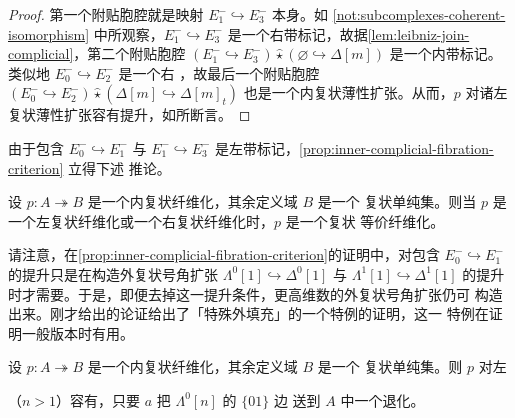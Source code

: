 \begin{proof}
第一个附贴胞腔就是映射 $E_{1}^{-}\hookrightarrow E_{3}^{-}$ 本身。如
\cref{not:subcomplexes-coherent-isomorphism} 中所观察，$E_{1}^{-}\hookrightarrow E_{3}^{-}$
是一个右带标记\trAnodyneExtension，故据\cref{lem:leibniz-join-complicial}，第二个附贴胞腔
$(E_{1}^{-}\hookrightarrow E_{3}^{-})\mathbin{\hat{\star}}(\varnothing\hookrightarrow\Delta[m])$
是一个内带标记\trAnodyneExtension。类似地 $E_{0}^{-}\hookrightarrow E_{2}^{-}$ 是一个右%
\trAnodyneExtension，故最后一个附贴胞腔
$(E_{0}^{-}\hookrightarrow E_{2}^{-})\mathbin{\hat{\star}}(\Delta[m]\hookrightarrow\Delta[m]_{t})$
也是一个内复状薄性扩张。从而，$p$ 对诸左复状薄性扩张容有提升，如所断言。
\end{proof}

由于包含 $E_{0}^{-}\hookrightarrow E_{1}^{-}$ 与 $E_{1}^{-}\hookrightarrow E_{3}^{-}$
是左带标记\trAnodyneExtension，\cref{prop:inner-complicial-fibration-criterion} 立得下述
推论。

\begin{corollary}\label{cor:left-right-complicial-fibration}
设 $p\colon A\twoheadrightarrow B$ 是一个内复状纤维化，其余定义域 $B$ 是一个
复状单纯集。则当 $p$ 是一个左复状纤维化或一个右复状纤维化时，$p$ 是一个复状
等价纤维化。
\end{corollary}

请注意，在\cref{prop:inner-complicial-fibration-criterion}的证明中，对包含
$E_{0}^{-}\hookrightarrow E_{1}^{-}$ 的提升只是在构造外复状号角扩张
$\Lambda^{0}[1]\hookrightarrow\Delta^{0}[1]$ 与 $\Lambda^{1}[1]\hookrightarrow\Delta^{1}[1]$
的提升时才需要。于是，即便去掉这一提升条件，更高维数的外复状号角扩张仍可
构造出来。刚才给出的论证给出了「特殊外\trHorn{}填充」的一个特例的证明，这一
特例在证明一般版本时有用。

\begin{lemma}\label{lem:left-horn-filling-degenerate-edge}
设 $p\colon A\twoheadrightarrow B$ 是一个内复状纤维化，其余定义域 $B$ 是一个
复状单纯集。则 $p$ 对左\trHorn
\begin{center}
\end{center}
（$n>1$）容有\trFiller，只要 $a$ 把\trHorn{} $\Lambda^{0}[n]$ 的 $\{01\}$ 边
送到 $A$ 中一个退化\trSimplex。
\end{lemma}

